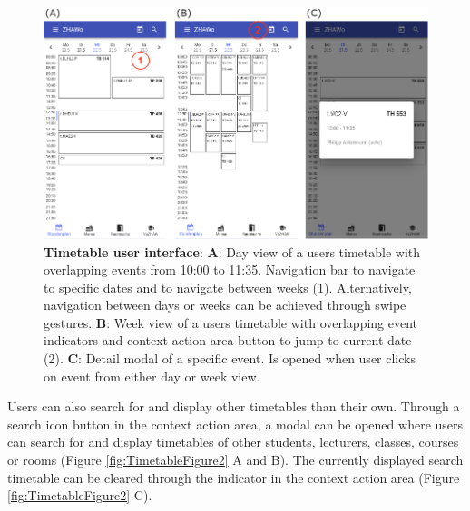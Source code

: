 \begin{markdown}
\begin{figure}[H]
  \includegraphics[width=16cm, center]{./figures/timetable_figure1.png}
  \captionsetup{width=15.5cm}
  \caption[Timetable user interface]{\textbf{Timetable user interface}: \textbf{A}: Day view of a users timetable with overlapping events from 10:00 to 11:35. Navigation bar to navigate to specific dates and to navigate between weeks (1). Alternatively, navigation between days or weeks can be achieved through swipe gestures. \textbf{B}: Week view of a users timetable with overlapping event indicators and context action area button to jump to current date (2). \textbf{C}: Detail modal of a specific event. Is opened when user clicks on event from either day or week view.}
  \label{fig:TimetableFigure1}
\end{figure}

Users can also search for and display other timetables than their own. Through a search icon button in the context action area, a modal can be opened where users can search for and display timetables of other students, lecturers, classes, courses or rooms (Figure \ref{fig:TimetableFigure2} A and B). The currently displayed search timetable can be cleared through the indicator in the context action area (Figure \ref{fig:TimetableFigure2} C).


\end{markdown}
